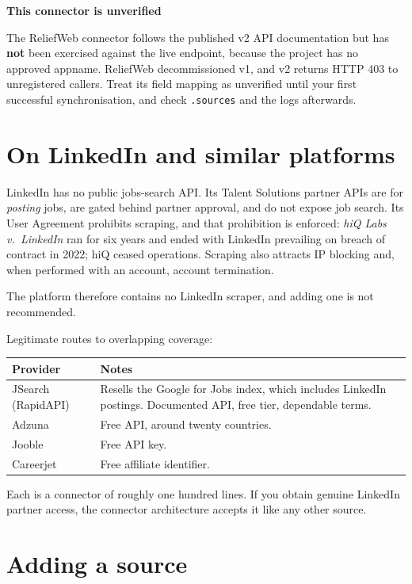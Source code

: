 \documentclass[11pt,a4paper]{report}
\newenvironment{callout}[1]
  {\begin{framed}\noindent\textbf{\textcolor{phcWarnInk}{#1}}\par\vspace{3pt}\small}
  {\end{framed}}
\begin{document}
\begin{callout}{This connector is unverified}
The ReliefWeb connector follows the published v2 API documentation but has
\textbf{not} been exercised against the live endpoint, because the project has
no approved appname. ReliefWeb decommissioned v1, and v2 returns HTTP 403 to
unregistered callers. Treat its field mapping as unverified until your first
successful synchronisation, and check \texttt{.sources} and the logs
afterwards.
\end{callout}

\section{On LinkedIn and similar platforms}
\label{sec:linkedin}

LinkedIn has no public jobs-search API. Its Talent Solutions partner APIs are
for \emph{posting} jobs, are gated behind partner approval, and do not expose
job search. Its User Agreement prohibits scraping, and that prohibition is
enforced: \emph{hiQ Labs v.\ LinkedIn} ran for six years and ended with
LinkedIn prevailing on breach of contract in 2022; hiQ ceased operations.
Scraping also attracts IP blocking and, when performed with an account, account
termination.

The platform therefore contains no LinkedIn scraper, and adding one is not
recommended.

Legitimate routes to overlapping coverage:

\begin{center}
\begin{tabularx}{\textwidth}{@{}lX@{}}
\toprule
\textbf{Provider} & \textbf{Notes} \\
\midrule
JSearch (RapidAPI) & Resells the Google for Jobs index, which includes LinkedIn
postings. Documented API, free tier, dependable terms. \\
Adzuna & Free API, around twenty countries. \\
Jooble & Free API key. \\
Careerjet & Free affiliate identifier. \\
\bottomrule
\end{tabularx}
\end{center}

Each is a connector of roughly one hundred lines. If you obtain genuine
LinkedIn partner access, the connector architecture accepts it like any other
source.

\section{Adding a source}
\end{document}
